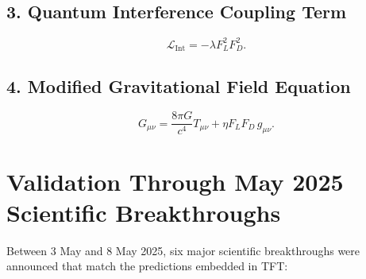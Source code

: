 \documentclass[11pt]{article}
\begin{document}
\subsection*{3. Quantum Interference Coupling Term}
\begin{equation}
\mathcal{L}_{\text{Int}} = -\lambda F_L^2 F_D^2.
\end{equation}

\subsection*{4. Modified Gravitational Field Equation}
\begin{equation}
G_{\mu \nu} = \frac{8\pi G}{c^4} T_{\mu \nu} + \eta F_L F_D \, g_{\mu \nu}.
\end{equation}

\section*{Validation Through May 2025 Scientific Breakthroughs}

Between 3 May and 8 May 2025, six major scientific breakthroughs were announced that match the predictions embedded in TFT:
\end{document}
